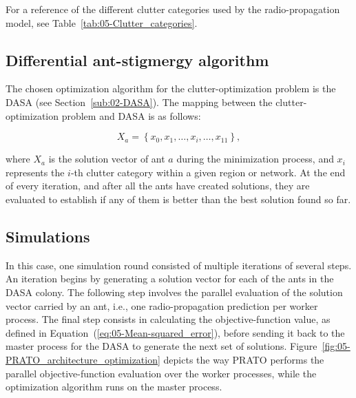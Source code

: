 For a reference of the different clutter categories used by the radio-propagation
model, see Table~\ref{tab:05-Clutter_categories}.


\subsection{Differential ant-stigmergy algorithm}

The chosen optimization algorithm for the clutter-optimization problem
is the DASA (see Section~\ref{sub:02-DASA}). The mapping between
the clutter-optimization problem and DASA is as follows:

\begin{equation}
X_{a}=\left\{ x_{0},x_{1},\ldots,x_{i},\ldots,x_{11}\right\} ,\label{eq:DASA-problem_mapping}
\end{equation}


\noindent where $X_{a}$ is the solution vector of ant $a$ during
the minimization process, and $x_{i}$ represents the $i$-th clutter
category within a given region or network. At the end of every iteration,
and after all the ants have created solutions, they are evaluated
to establish if any of them is better than the best solution found
so far.


\subsection{Simulations}

In this case, one simulation round consisted of multiple iterations
of several steps. An iteration begins by generating a solution vector
for each of the ants in the DASA colony. The following step involves
the parallel evaluation of the solution vector carried by an ant,
i.e., one radio-propagation prediction per worker process. The final
step consists in calculating the objective-function value, as defined
in Equation~(\ref{eq:05-Mean-squared_error}), before sending it
back to the master process for the DASA to generate the next set of
solutions. Figure~\ref{fig:05-PRATO_architecture_optimization} depicts
the way PRATO performs the parallel objective-function evaluation
over the worker processes, while the optimization algorithm runs on
the master process.

